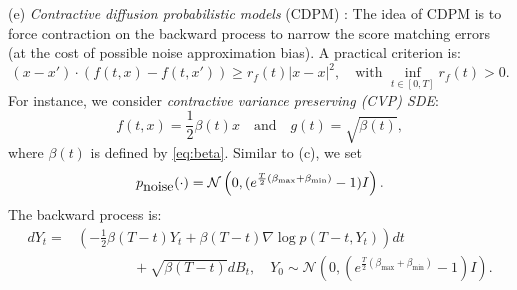 \documentclass[letterpaper,11pt,reqno]{amsart}
\numberwithin{equation}{section}
\begin{document}
\noindent
(e) {\em Contractive diffusion probabilistic models} (CDPM) \cite{TZ24}:
The idea of CDPM is to force contraction on the backward process
to narrow the score matching errors
(at the cost of possible noise approximation bias).
A practical criterion is:
\begin{equation}
\label{eq:rfpositive}
(x -x') \cdot (f(t,x) - f(t, x')) \ge r_f(t) |x-x|^2, \quad \mbox{with }  \inf _{t \in [0, T]}r_f(t) > 0.
\end{equation}
For instance, we consider {\em contractive variance preserving (CVP) SDE}:
\begin{equation}
\label{eq:defCVP}
f(t,x) = \frac{1}{2} \beta(t)x \quad \mbox{and} \quad g(t) = \sqrt{\beta(t)},
\end{equation}
where $\beta(t)$ is defined by \eqref{eq:beta}.
Similar to (c), we set 
$$p_{\tiny \mbox{noise}}(\cdot) = \mathcal{N}\left( 0, 
(e^{\frac{T}{2} (\beta_{\max} + \beta_{\min})}-1) I \right).$$
The backward process is:
\begin{equation}
\begin{aligned}
d Y_t  = & \left(-\frac{1}{2} \beta(T-t) Y_t  +\beta(T-t) \nabla \log p(T-t, Y_t)\right)  dt \\
& \qquad \qquad + \sqrt{\beta(T-t)} dB_t, \quad 
Y_0 \sim \mathcal{N}\left( 0, 
(e^{\frac{T}{2} (\beta_{\max} + \beta_{\min})}-1 ) I \right).
\end{aligned}
\end{equation}

\end{document}

